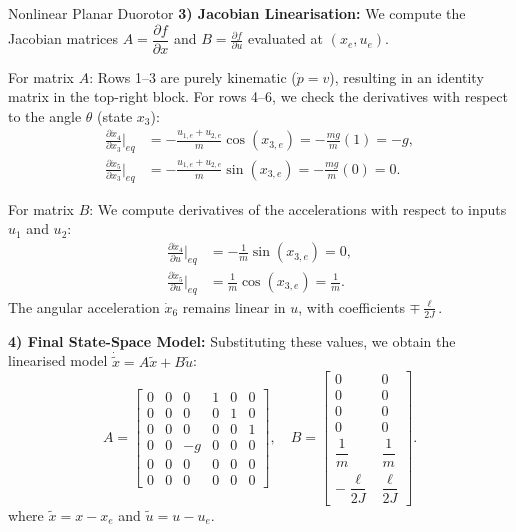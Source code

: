 \begin{examplebox}{Nonlinear Planar Duorotor}
	\medskip
	\textbf{3) Jacobian Linearisation:}
	We compute the Jacobian matrices $A = \dfrac{\partial f}{\partial x}$ and $B = \frac{\partial f}{\partial u}$ evaluated at $(x_e, u_e)$.
	
	For matrix $A$:
	Rows 1--3 are purely kinematic ($\dot{p} = v$), resulting in an identity matrix in the top-right block. For rows 4--6, we check the derivatives with respect to the angle $\theta$ (state $x_3$):
	\begin{align*}
		\frac{\partial \dot{x}_4}{\partial x_3} \bigg|_{eq} &= -\frac{u_{1,e}+u_{2,e}}{m}\cos(x_{3,e}) = -\frac{mg}{m}(1) = -g, \\
		\frac{\partial \dot{x}_5}{\partial x_3} \bigg|_{eq} &= -\frac{u_{1,e}+u_{2,e}}{m}\sin(x_{3,e}) = -\frac{mg}{m}(0) = 0.
	\end{align*}
	
	For matrix $B$:
	We compute derivatives of the accelerations with respect to inputs $u_1$ and $u_2$:
	\begin{align*}
		\frac{\partial \dot{x}_4}{\partial u} \bigg|_{eq} &= -\frac{1}{m}\sin(x_{3,e}) = 0, \\
		\frac{\partial \dot{x}_5}{\partial u} \bigg|_{eq} &= \frac{1}{m}\cos(x_{3,e}) = \frac{1}{m}.
	\end{align*}
	The angular acceleration $\dot{x}_6$ remains linear in $u$, with coefficients $\mp \frac{\ell}{2J}$.
	
	\medskip
	\textbf{4) Final State-Space Model:}
	Substituting these values, we obtain the linearised model $\dot{\tilde{x}} = A \tilde{x} + B \tilde{u}$:
	\[
	A = 
	\begin{bmatrix}
		0 & 0 & 0 & 1 & 0 & 0 \\
		0 & 0 & 0 & 0 & 1 & 0 \\
		0 & 0 & 0 & 0 & 0 & 1 \\
		0 & 0 & -g & 0 & 0 & 0 \\
		0 & 0 & 0 & 0 & 0 & 0 \\
		0 & 0 & 0 & 0 & 0 & 0
	\end{bmatrix},
	\quad
	B = 
	\begin{bmatrix}
		0 & 0 \\
		0 & 0 \\
		0 & 0 \\
		0 & 0 \\
		\dfrac{1}{m} & \dfrac{1}{m} \\[4pt]
		-\dfrac{\ell}{2J} & \dfrac{\ell}{2J}
	\end{bmatrix}.
	\]
	where $\tilde{x} = x - x_e$ and $\tilde{u} = u - u_e$.
\end{examplebox}



